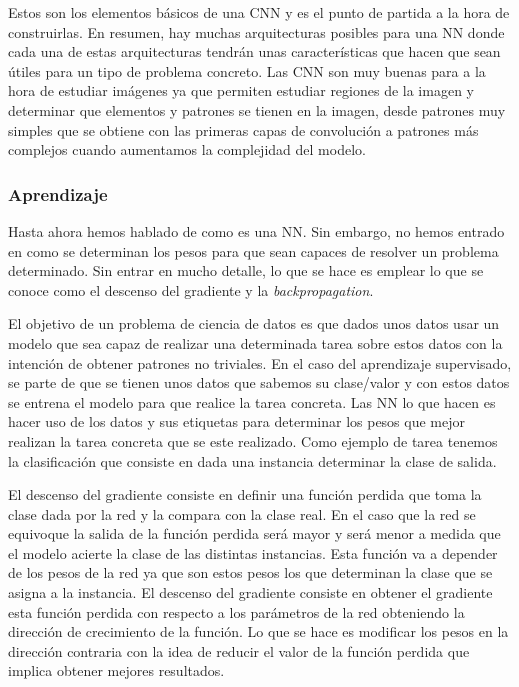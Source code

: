 \documentclass[a4paper,12pt,twoside,titlepage]{article}
\begin{document}
Estos son los elementos básicos de una CNN y es el punto de partida a la hora de construirlas. En resumen, hay muchas arquitecturas posibles para una NN donde cada una de estas arquitecturas tendrán unas características que hacen que sean útiles para un tipo de problema concreto. Las CNN son muy buenas para a la hora de estudiar imágenes ya que permiten estudiar regiones de la imagen y determinar que elementos y patrones se tienen en la imagen, desde patrones muy simples que se obtiene con las primeras capas de convolución a patrones más complejos cuando aumentamos la complejidad del modelo.

\subsubsection*{Aprendizaje}

Hasta ahora hemos hablado de como es una NN. Sin embargo, no hemos entrado en como se determinan los pesos para que sean capaces de resolver un problema determinado. Sin entrar en mucho detalle, lo que se hace es emplear lo que se conoce como el descenso del gradiente y la \textit{backpropagation}.

El objetivo de un problema de ciencia de datos es que dados unos datos usar un modelo que sea capaz de realizar una determinada tarea sobre estos datos con la intención de obtener patrones no triviales. En el caso del aprendizaje supervisado, se parte de que se tienen unos datos que sabemos su clase/valor y con estos datos se entrena el modelo para que realice la tarea concreta. Las NN lo que hacen es hacer uso de los datos y sus etiquetas para determinar los pesos que mejor realizan la tarea concreta que se este realizado. Como ejemplo de tarea tenemos la clasificación que consiste en dada una instancia determinar la clase de salida.

El descenso del gradiente consiste en definir una función perdida que toma la clase dada por la red y la compara con la clase real. En el caso que la red se equivoque la salida de la función perdida será mayor y será menor a medida que el modelo acierte la clase de las distintas instancias. Esta función va a depender de los pesos de la red ya que son estos pesos los que determinan la clase que se asigna a la instancia. El descenso del gradiente consiste en obtener el gradiente esta función perdida con respecto a los parámetros de la red obteniendo la dirección de crecimiento de la función. Lo que se hace es modificar los pesos en la dirección contraria con la idea de reducir el valor de la función perdida que implica obtener mejores resultados.
\end{document}
